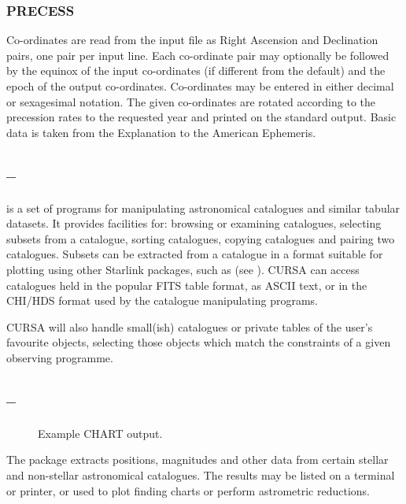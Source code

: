 \subsubsection{PRECESS}

Co-ordinates are read from the input file as Right Ascension and Declination pairs, one pair per
input line.  Each co-ordinate pair may optionally be followed by the equinox
of the input co-ordinates (if different from the default) and the epoch of the
output co-ordinates.  Co-ordinates may be entered in either decimal or
sexagesimal notation.  The given co-ordinates are rotated according to the
precession rates to the requested year and printed on the standard output. 
Basic data is taken from the Explanation to the American Ephemeris. 
    

\subsection{{\CURSAref} -- {\STARLINKref}} 
\label{sec:cursa}
  

{\CURSAref} is a set of {\STARLINKref} programs for manipulating astronomical
catalogues and similar tabular datasets. It provides facilities for: browsing
or examining catalogues, selecting subsets from a catalogue, sorting
catalogues, copying catalogues and pairing two catalogues. Subsets can be
extracted from a catalogue in a format suitable for plotting using other
Starlink packages, such as {\PONGOref} (see {\PONGSUNref)}. CURSA can access 
catalogues held in the popular FITS table format, as ASCII text, or in the 
CHI/HDS format used by the {\CATPACref} catalogue manipulating programs. 
 	
CURSA will also handle small(ish) catalogues or private tables of the user's 
favourite objects, selecting those objects which match the constraints of a given 
observing programme.

\subsection{{\CHARTref} -- {\STARLINKref}} 
\label{sec:chart}

\begin{figure}[htbp]
\leavevmode
\centering {}
\vspace{5mm}
\caption{Example CHART output.}
\label{fig_chart}
\end{figure}

The {\CHARTref} package extracts positions, magnitudes and other data from certain
stellar and non-stellar astronomical catalogues. The results may be listed on
a terminal or printer, or used to plot finding charts or perform astrometric
reductions. 
 
